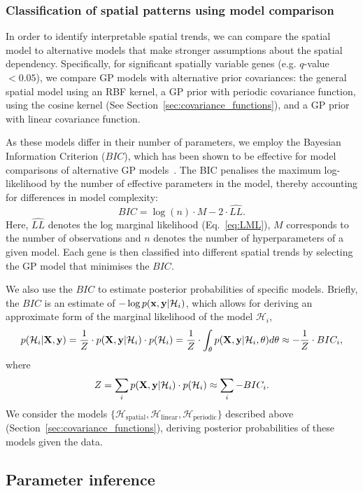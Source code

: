 \subsubsection*{Classification of spatial patterns using model comparison}

In order to identify interpretable spatial trends, we can compare the spatial model to alternative models that make stronger assumptions about the spatial dependency. 
Specifically, for significant spatially variable genes (e.g. \( q \)-value \( < 0.05 \)), we compare GP models with alternative prior covariances: the general spatial model using an RBF kernel, a GP prior with periodic covariance function, using the cosine kernel (See Section~\ref{sec:covariance_functions}), and a GP prior with linear covariance function.

As these models differ in their number of parameters, we employ the Bayesian Information Criterion (\( BIC \)), which has been shown to be effective for model comparisons of alternative GP models~\cite{Lloyd2014-ky}. The BIC penalises the maximum log-likelihood by the number of effective parameters in the model, thereby accounting for differences in model complexity:
\[
BIC = \log (n) \cdot M - 2 \cdot \hat{LL}.
\]
Here, \( \hat{LL} \) denotes the log marginal likelihood (Eq.~\ref{eq:LML}), $ M $ corresponds to the number of observations and $n$ denotes the number of hyperparameters of a given model. Each gene is then classified into different spatial trends by selecting the GP model that minimises the \( BIC \).

We also use the \( BIC \) to estimate posterior probabilities of specific models. Briefly, the \( BIC \) is an estimate of \( -\log p( {\bf x}, {\bf y} | \mathcal{H}_i ) \), which allows for deriving an approximate form of the marginal likelihood of the model \( \mathcal{H}_i \),
\[
p( \mathcal{H}_i | {\bf X}, {\bf y}) = \frac{1}{Z} \cdot p({\bf X}, {\bf y} | \mathcal{H}_i) \cdot p( \mathcal{H}_i ) = \frac{1}{Z} \cdot \int_{\theta} p( {\bf X}, {\bf y} | \mathcal{H}_i, \theta ) d \theta \approx -\frac{1}{Z} \cdot BIC_i, 
\]
where
\[
Z = \sum_i p({\bf X}, {\bf y} | \mathcal{H}_i) \cdot p( \mathcal{H}_i ) \approx \sum_i -BIC_i.
\]
We consider the models \( \{ \mathcal{H}_{\text{spatial}}, \mathcal{H}_{\text{linear}}, \mathcal{H}_{\text{periodic}} \} \) described above (Section~\ref{sec:covariance_functions}), deriving posterior probabilities of these models given the data.


\subsection{Parameter inference}
\label{sec:param_inference}

